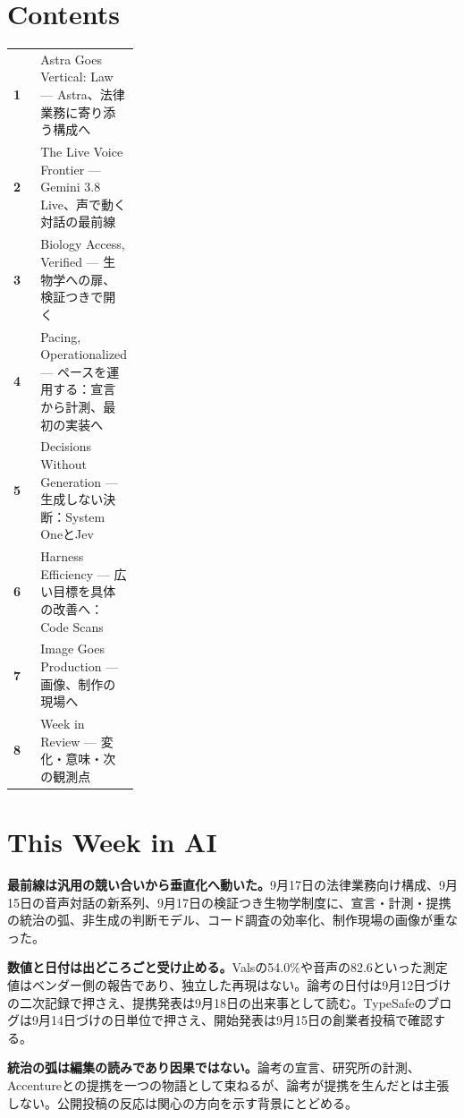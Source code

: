 \section*{Contents}
\begin{tabularx}{0.98\linewidth}{@{}>{\bfseries}p{0.28\linewidth}X@{}}
  1 & Astra Goes Vertical: Law --- Astra、法律業務に寄り添う構成へ \\
  2 & The Live Voice Frontier --- Gemini 3.8 Live、声で動く対話の最前線 \\
  3 & Biology Access, Verified --- 生物学への扉、検証つきで開く \\
  4 & Pacing, Operationalized --- ペースを運用する：宣言から計測、最初の実装へ \\
  5 & Decisions Without Generation --- 生成しない決断：System OneとJev \\
  6 & Harness Efficiency --- 広い目標を具体の改善へ：Code Scans \\
  7 & Image Goes Production --- 画像、制作の現場へ \\
  8 & Week in Review --- 変化・意味・次の観測点 \\
\end{tabularx}

\vspace{4mm}
\section*{This Week in AI}

\begin{tcolorbox}[enhanced,colback=SurveySoft,colframe=SurveyRule,boxrule=0.4pt,arc=1mm,left=3mm,right=3mm,top=2mm,bottom=2mm]
\textbf{最前線は汎用の競い合いから垂直化へ動いた。}\quad 9月17日の法律業務向け構成、9月15日の音声対話の新系列、9月17日の検証つき生物学制度に、宣言・計測・提携の統治の弧、非生成の判断モデル、コード調査の効率化、制作現場の画像が重なった。
\end{tcolorbox}

\begin{tcolorbox}[enhanced,colback=SurveySoft,colframe=SurveyRule,boxrule=0.4pt,arc=1mm,left=3mm,right=3mm,top=2mm,bottom=2mm]
\textbf{数値と日付は出どころごと受け止める。}\quad Valsの54.0\%や音声の82.6といった測定値はベンダー側の報告であり、独立した再現はない。論考の日付は9月12日づけの二次記録で押さえ、提携発表は9月18日の出来事として読む。TypeSafeのブログは9月14日づけの日単位で押さえ、開始発表は9月15日の創業者投稿で確認する。
\end{tcolorbox}

\begin{tcolorbox}[enhanced,colback=SurveySoft,colframe=SurveyRule,boxrule=0.4pt,arc=1mm,left=3mm,right=3mm,top=2mm,bottom=2mm]
\textbf{統治の弧は編集の読みであり因果ではない。}\quad 論考の宣言、研究所の計測、Accentureとの提携を一つの物語として束ねるが、論考が提携を生んだとは主張しない。公開投稿の反応は関心の方向を示す背景にとどめる。
\end{tcolorbox}

